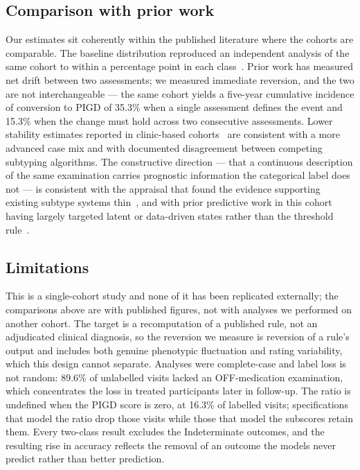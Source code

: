 \documentclass[journal]{IEEEtran}
\begin{document}
\subsection{Comparison with prior work}
Our estimates sit coherently within the published literature where the cohorts
are comparable. The baseline distribution reproduced an independent analysis of
the same cohort to within a percentage point in each
class~\cite{simuni2016}. Prior work has measured net drift between two
assessments; we measured immediate reversion, and the two are not
interchangeable --- the same cohort yields a five-year cumulative incidence of
conversion to PIGD of 35.3\% when a single assessment defines the event and
15.3\% when the change must hold across two consecutive assessments. Lower
stability estimates reported in clinic-based
cohorts~\cite{ren2020,ren2021,kohat2021} are consistent with a more advanced
case mix and with documented disagreement between competing subtyping
algorithms. The constructive direction --- that a continuous description of the
same examination carries prognostic information the categorical label does not
--- is consistent with the appraisal that found the evidence supporting existing
subtype systems thin~\cite{mestre2021,marras2024}, and with prior predictive
work in this cohort having largely targeted latent or data-driven states rather
than the threshold rule~\cite{severson2021,fereshtehnejad2017}.

\subsection{Limitations}
This is a single-cohort study and none of it has been replicated externally; the
comparisons above are with published figures, not with analyses we performed on
another cohort. The target is a recomputation of a published rule, not an
adjudicated clinical diagnosis, so the reversion we measure is reversion of a
rule's output and includes both genuine phenotypic fluctuation and rating
variability, which this design cannot separate. Analyses were complete-case and
label loss is not random: 89.6\% of unlabelled visits lacked an OFF-medication
examination, which concentrates the loss in treated participants later in
follow-up. The ratio is undefined when the PIGD score is zero, at 16.3\% of
labelled visits; specifications that model the ratio drop those visits while
those that model the subscores retain them. Every two-class result excludes the
Indeterminate outcomes, and the resulting rise in accuracy reflects the removal
of an outcome the models never predict rather than better prediction.
\end{document}
